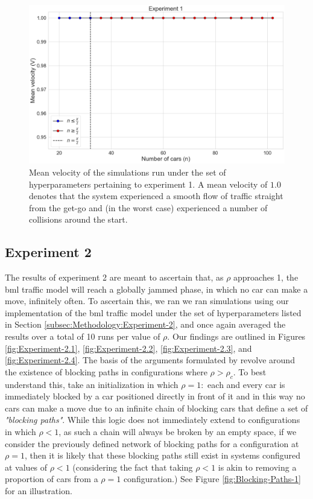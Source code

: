 \begin{figure}[H]
    \centering
    \includegraphics[width=\linewidth]{Images/Section 4/Experiment 1/1.2.pdf}
    \caption{Mean velocity of the simulations run under the set of hyperparameters pertaining to experiment 1. A mean velocity of $1.0$ denotes that the system experienced a smooth flow of traffic straight from the get-go and (in the worst case) experienced a number of collisions around the start.}
    \label{fig:Experiment-1.1}
\end{figure}

\subsection{Experiment 2}
\label{subsec:Results-and-Discussion:Experiment-2}
The results of experiment 2 are meant to ascertain that, as $\rho$ approaches 1, the \gls{bml} traffic model will reach a globally jammed phase, in which no car can make a move, infinitely often. To ascertain this, we ran we ran simulations using our implementation of the \gls{bml} traffic model under the set of hyperparameters listed in Section \ref{subsec:Methodology:Experiment-2}, and once again averaged the results over a total of 10 runs per value of $\rho$. Our findings are outlined in Figures \ref{fig:Experiment-2.1}, \ref{fig:Experiment-2.2}, \ref{fig:Experiment-2.3}, and \ref{fig:Experiment-2.4}. The basis of the arguments formulated by \citeauthor{Omer} revolve around the existence of blocking paths in configurations where $\rho > \rho_c$. To best understand this, take an initialization in which $\rho = 1:$  each and every car is immediately blocked by a car positioned directly in front of it and in this way no cars can make a move due to an infinite chain of blocking cars that define a set of \textit{"blocking paths"}. While this logic does not immediately extend to configurations in which $\rho < 1$, as such a chain will always be broken by an empty space, if we consider the previously defined network of blocking paths for a configuration at $\rho = 1$, then it is likely that these blocking paths still exist in systems configured at values of $\rho < 1$ (considering the fact that taking $\rho < 1$ is akin to removing a proportion of cars from a $\rho = 1$ configuration.) See Figure \ref{fig:Blocking-Paths-1} for an illustration.

